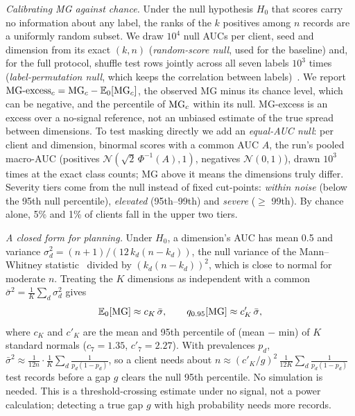 \emph{Calibrating MG against chance.} Under the null hypothesis $H_0$ that scores carry no information about any label, the ranks of the $k$ positives among $n$ records are a uniformly random subset. We draw $10^4$ null AUCs per client, seed and dimension from its exact $(k,n)$ (\emph{random-score null}, used for the baseline) and, for the full protocol, shuffle test rows jointly across all seven labels $10^3$ times (\emph{label-permutation null}, which keeps the correlation between labels)~\cite{ojala2010}. We report $\text{MG-excess}_c = \mathrm{MG}_c - \mathbb{E}_0[\mathrm{MG}_c]$, the observed MG minus its chance level, which can be negative, and the percentile of $\mathrm{MG}_c$ within its null. MG-excess is an excess over a no-signal reference, not an unbiased estimate of the true spread between dimensions. To test masking directly we add an \emph{equal-AUC null}: per client and dimension, binormal scores with a common AUC $A$, the run's pooled macro-AUC (positives $\mathcal{N}(\sqrt{2}\,\Phi^{-1}(A),1)$, negatives $\mathcal{N}(0,1)$), drawn $10^3$ times at the exact class counts; MG above it means the dimensions truly differ. Severity tiers come from the null instead of fixed cut-points: \emph{within noise} (below the 95th null percentile), \emph{elevated} (95th--99th) and \emph{severe} ($\geq$ 99th). By chance alone, 5\% and 1\% of clients fall in the upper two tiers.

\emph{A closed form for planning.} Under $H_0$, a dimension's AUC has mean 0.5 and variance $\sigma_d^2 = (n+1)/(12\,k_d(n-k_d))$, the null variance of the Mann--Whitney statistic~\cite{mann1947} divided by $(k_d(n-k_d))^2$, which is close to normal for moderate $n$. Treating the $K$ dimensions as independent with a common $\bar\sigma^2 = \frac{1}{K}\sum_d \sigma_d^2$ gives
\begin{equation}
\mathbb{E}_0[\mathrm{MG}] \approx c_K\,\bar\sigma, \qquad q_{0.95}[\mathrm{MG}] \approx c'_K\,\bar\sigma ,\label{eq:closed}
\end{equation}
where $c_K$ and $c'_K$ are the mean and 95th percentile of (mean $-$ min) of $K$ standard normals ($c_7 = 1.35$, $c'_7 = 2.27$). With prevalences $p_d$, $\bar\sigma^2 \approx \frac{1}{12n}\cdot\frac{1}{K}\sum_d \frac{1}{p_d(1-p_d)}$, so a client needs about $n \approx (c'_K/g)^2\,\frac{1}{12K}\sum_d \frac{1}{p_d(1-p_d)}$ test records before a gap $g$ clears the null 95th percentile. No simulation is needed. This is a threshold-crossing estimate under no signal, not a power calculation; detecting a true gap $g$ with high probability needs more records.

